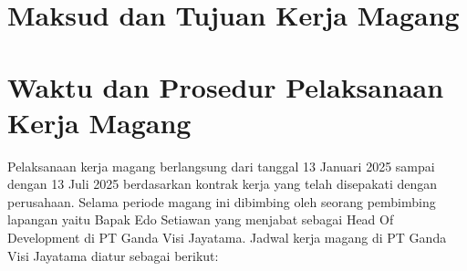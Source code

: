

\section{Maksud dan Tujuan Kerja Magang}








\section{Waktu dan Prosedur Pelaksanaan Kerja Magang}

Pelaksanaan kerja magang berlangsung dari tanggal 13 Januari 2025 sampai dengan 
13 Juli 2025 berdasarkan kontrak kerja yang telah disepakati dengan perusahaan. Selama periode magang ini dibimbing oleh seorang pembimbing lapangan yaitu Bapak Edo Setiawan yang menjabat sebagai Head Of Development di PT Ganda Visi Jayatama. Jadwal kerja magang di PT Ganda Visi Jayatama diatur sebagai berikut:

